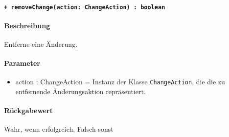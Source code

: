 \paragraph{\texttt{+ removeChange(action: ChangeAction) : boolean}}%
\paragraph*{Beschreibung}
Entferne eine Änderung.
\paragraph*{Parameter}
\begin{itemize}
    \item action : ChangeAction = Instanz der Klasse \verb#ChangeAction#, die die zu entfernende Änderungsaktion repräsentiert.
\end{itemize}
\paragraph*{Rückgabewert}
Wahr, wenn erfolgreich, Falsch sonst
